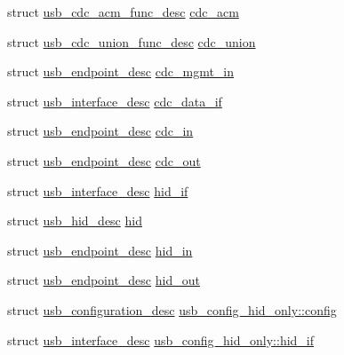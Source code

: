 \begin{DoxyCompactItemize}
\item 
struct \hyperlink{structusb__cdc__acm__func__desc}{usb\-\_\-cdc\-\_\-acm\-\_\-func\-\_\-desc} \hyperlink{group___p_i_o_s___u_s_b___d_e_s_c_ga01dd695368c912334b2f36175515ba62}{cdc\-\_\-acm}
\item 
struct \hyperlink{structusb__cdc__union__func__desc}{usb\-\_\-cdc\-\_\-union\-\_\-func\-\_\-desc} \hyperlink{group___p_i_o_s___u_s_b___d_e_s_c_ga18f1bcfd867862a7b68cf2307ff2df6d}{cdc\-\_\-union}
\item 
struct \hyperlink{structusb__endpoint__desc}{usb\-\_\-endpoint\-\_\-desc} \hyperlink{group___p_i_o_s___u_s_b___d_e_s_c_ga712d76be7f3a64d87d05fabc10e2686e}{cdc\-\_\-mgmt\-\_\-in}
\item 
struct \hyperlink{structusb__interface__desc}{usb\-\_\-interface\-\_\-desc} \hyperlink{group___p_i_o_s___u_s_b___d_e_s_c_gab685a3142df1c86fb19d69d84a296989}{cdc\-\_\-data\-\_\-if}
\item 
struct \hyperlink{structusb__endpoint__desc}{usb\-\_\-endpoint\-\_\-desc} \hyperlink{group___p_i_o_s___u_s_b___d_e_s_c_ga45cebf693381151be1d05f36c5ef2555}{cdc\-\_\-in}
\item 
struct \hyperlink{structusb__endpoint__desc}{usb\-\_\-endpoint\-\_\-desc} \hyperlink{group___p_i_o_s___u_s_b___d_e_s_c_ga9c39f39e6301c0d93317b2027a769a5a}{cdc\-\_\-out}
\item 
struct \hyperlink{structusb__interface__desc}{usb\-\_\-interface\-\_\-desc} \hyperlink{group___p_i_o_s___u_s_b___d_e_s_c_ga66dd41530dc7e219cf377870362857ce}{hid\-\_\-if}
\item 
struct \hyperlink{structusb__hid__desc}{usb\-\_\-hid\-\_\-desc} \hyperlink{group___p_i_o_s___u_s_b___d_e_s_c_ga6eb333cd7c6d156f25fa827aa085579c}{hid}
\item 
struct \hyperlink{structusb__endpoint__desc}{usb\-\_\-endpoint\-\_\-desc} \hyperlink{group___p_i_o_s___u_s_b___d_e_s_c_gad74809997499537622da0aaac4d1c3da}{hid\-\_\-in}
\item 
struct \hyperlink{structusb__endpoint__desc}{usb\-\_\-endpoint\-\_\-desc} \hyperlink{group___p_i_o_s___u_s_b___d_e_s_c_ga0e5a30c27a737b9c3e117e4e8b755b8d}{hid\-\_\-out}
\item 
struct \hyperlink{structusb__configuration__desc}{usb\-\_\-configuration\-\_\-desc} \hyperlink{group___p_i_o_s___u_s_b___d_e_s_c_gae5e25501e424468c229df0d1e09423a8}{usb\-\_\-config\-\_\-hid\-\_\-only\-::config}
\item 
struct \hyperlink{structusb__interface__desc}{usb\-\_\-interface\-\_\-desc} \hyperlink{group___p_i_o_s___u_s_b___d_e_s_c_gab8d4a603dbaaacc357e4beb426cfd094}{usb\-\_\-config\-\_\-hid\-\_\-only\-::hid\-\_\-if}

\end{DoxyCompactItemize}
